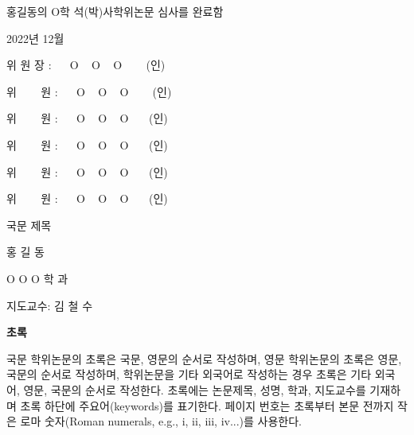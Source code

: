 \documentclass[11pt]{report}
\numberwithin{figure}{chapter}
\begin{document}
\newpage 
\par\vspace{1cm}
\Large 홍길동의 O학 석(박)사학위논문 심사를 완료함
\par\vspace{3cm} %
\large 2022년 12월 %
\par\vspace{2cm}
\Large 
위 원 장 : ~~ O ~ O ~ O ~~~ (인) \par 
\vspace{1cm}
위 ~~~ 원 : ~~ O ~ O ~ O ~~~ (인) \par
\vspace{1cm}
위 ~~~ 원 : ~~ O ~ O ~ O ~~~(인) \par
\vspace{1cm}
위 ~~~ 원 : ~~ O ~ O ~ O ~~~(인) \par %
\vspace{1cm}
위 ~~~ 원 : ~~ O ~ O ~ O ~~~(인) \par %
\vspace{1cm}
위 ~~~ 원 : ~~ O ~ O ~ O ~~~(인) \par %

\newpage
{}
\begin{center}
\LARGE 국문 제목
\par\vspace{20pt}
\doublespacing
\normalsize 홍 길 동\par
O O O 학 과\par
지도교수: 김 철 수

\par\vspace{20pt}
\LARGE \textbf{초록}
\end{center}
\justifying
\doublespacing
\normalsize
국문 학위논문의 초록은 국문, 영문의 순서로 작성하며, 영문 학위논문의 초록은 영문, 국문의 순서로 작성하며, 학위논문을 기타 외국어로 작성하는 경우 초록은 기타 외국어, 영문, 국문의 순서로 작성한다.
초록에는 논문제목, 성명, 학과, 지도교수를 기재하며 초록 하단에 주요어(keywords)를 표기한다. 
페이지 번호는 초록부터 본문 전까지 작은 로마 숫자(Roman numerals, e.g., i, ii, iii, iv...)를 사용한다.
\par\vspace{1cm}
\end{document}
